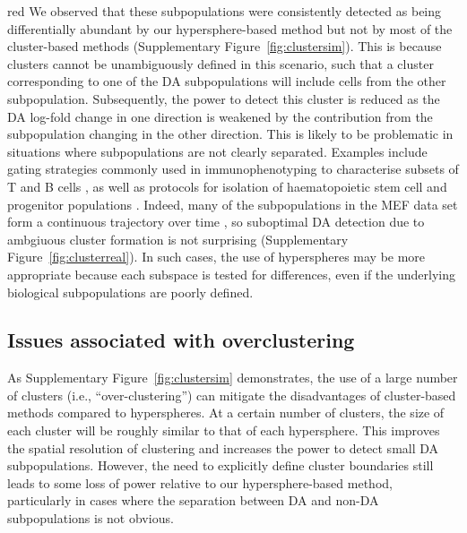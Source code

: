 \documentclass{article}
\begin{document}
\begin{color}{red}
We observed that these subpopulations were consistently detected as being differentially abundant by our hypersphere-based method but not by most of the cluster-based methods (Supplementary Figure~\ref{fig:clustersim}).
This is because clusters cannot be unambiguously defined in this scenario, such that a cluster corresponding to one of the DA subpopulations will include cells from the other subpopulation.
Subsequently, the power to detect this cluster is reduced as the DA log-fold change in one direction is weakened by the contribution from the subpopulation changing in the other direction.
This is likely to be problematic in situations where subpopulations are not clearly separated.
Examples include gating strategies commonly used in immunophenotyping to characterise subsets of T and B cells \cite{finak2016standardizing}, as well as protocols for isolation of haematopoietic stem cell and progenitor populations \cite{wilson2015combined}.
Indeed, many of the subpopulations in the MEF data set form a continuous trajectory over time \cite{zunder2015continuous}, so suboptimal DA detection due to ambgiuous cluster formation is not surprising (Supplementary Figure~\ref{fig:clusterreal}).
In such cases, the use of hyperspheres may be more appropriate because each subspace is tested for differences, even if the underlying biological subpopulations are poorly defined.
\end{color}


\subsection{Issues associated with overclustering}
As Supplementary Figure~\ref{fig:clustersim} demonstrates, the use of a large number of clusters (i.e., ``over-clustering'') can mitigate the disadvantages of cluster-based methods compared to hyperspheres.
At a certain number of clusters, the size of each cluster will be roughly similar to that of each hypersphere.
This improves the spatial resolution of clustering and increases the power to detect small DA subpopulations.
However, the need to explicitly define cluster boundaries still leads to some loss of power relative to our hypersphere-based method, particularly in cases where the separation between DA and non-DA subpopulations is not obvious.
\end{document}
